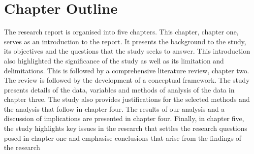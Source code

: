 \documentclass[a4paper]{article}
\begin{document}
	\section{Chapter Outline}
	The  research  report  is  organised  into  five  chapters.  This  chapter,  chapter  one,  serves  as  an introduction  to  the  report.  It  presents  the  background  to  the  study,  its  objectives  and  the questions  that the  study  seeks  to  answer.  This  introduction  also  highlighted  the  significance of the study as well as  its  limitation and delimitations. This  is  followed  by a comprehensive literature  review,  chapter  two.  The  review  is  followed  by  the  development  of  a  conceptual framework.  The  study  presents  details  of  the  data,  variables  and  methods  of  analysis  of  the data in chapter three. The study also provides  justifications  for the  selected  methods and the analysis  that  follow  in  chapter  four.  The  results  of  our  analysis  and  a  discussion  of implications  are  presented  in  chapter  four.  Finally,  in  chapter  five,  the  study  highlights  key issues  in the research that settles the research questions posed  in chapter one and emphasise conclusions that arise from the findings of the research
	
	\newpage
	\singlespacing
		
	
\end{document}
